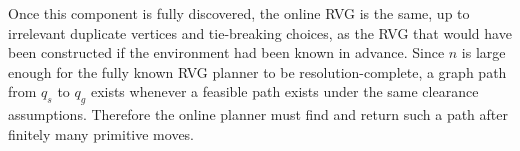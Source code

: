 \documentclass[letterpaper,11pt]{article}
\begin{document}
Once this component is fully discovered, the online RVG is the same, up to
irrelevant duplicate vertices and tie-breaking choices, as the RVG that would
have been constructed if the environment had been known in advance. Since
$n$ is large enough for the fully known RVG planner to be
resolution-complete, a graph path from $q_s$ to $q_g$ exists whenever a
feasible path exists under the same clearance assumptions. Therefore the online
planner must find and return such a path after finitely many primitive moves.



\end{document}
